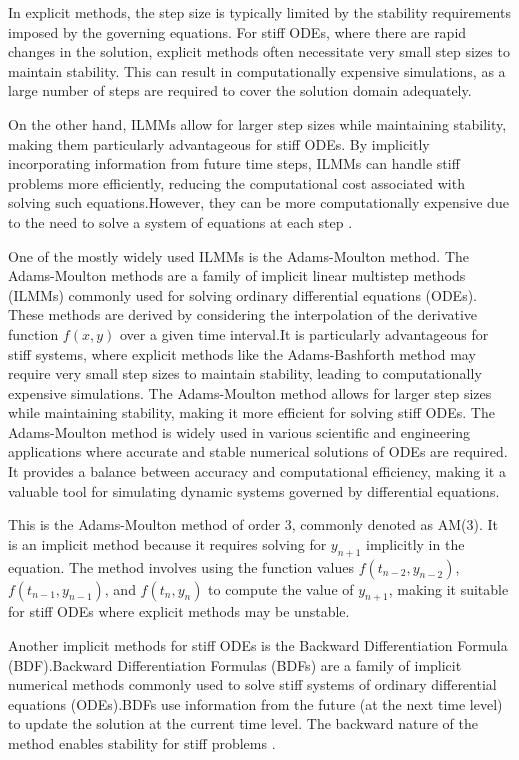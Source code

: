 In explicit methods, the step size is typically limited by the stability requirements imposed by the governing equations. For stiff ODEs, where there are rapid changes in the solution, explicit methods often necessitate very small step sizes to maintain stability. This can result in computationally expensive simulations, as a large number of steps are required to cover the solution domain adequately.

On the other hand, ILMMs allow for larger step sizes while maintaining stability, making them particularly advantageous for stiff ODEs. By implicitly incorporating information from future time steps, ILMMs can handle stiff problems more efficiently, reducing the computational cost associated with solving such equations.However, they can be more computationally expensive due to the need to solve a system of equations at each step \cite{thohura2013numerical}.

One of the mostly widely used ILMMs is the Adams-Moulton method. The Adams-Moulton methods are a family of implicit linear multistep methods (ILMMs) commonly used for solving ordinary differential equations (ODEs). These methods are derived by considering the interpolation of the derivative function $f(x,y)$ over a given time interval.It is particularly advantageous for stiff systems, where explicit methods like the Adams-Bashforth method may require very small step sizes to maintain stability, leading to computationally expensive simulations. The Adams-Moulton method allows for larger step sizes while maintaining stability, making it more efficient for solving stiff ODEs.
The Adams-Moulton method is widely used in various scientific and engineering applications where accurate and stable numerical solutions of ODEs are required. It provides a balance between accuracy and computational efficiency, making it a valuable tool for simulating dynamic systems governed by differential equations.




This is the Adams-Moulton method of order 3, commonly denoted as AM(3). It is an implicit method because it requires solving for \( y_{n+1} \) implicitly in the equation. The method involves using the function values \( f(t_{n-2}, y_{n-2}) \), \( f(t_{n-1}, y_{n-1}) \), and \( f(t_n, y_n) \) to compute the value of \( y_{n+1} \), making it suitable for stiff ODEs where explicit methods may be unstable.


Another implicit methods for stiff ODEs is the Backward Differentiation Formula (BDF).Backward Differentiation Formulas (BDFs) are a family of implicit numerical methods commonly used to solve stiff systems of ordinary differential equations (ODEs).BDFs use information from the future (at the next time level) to update the solution at the current time level. The backward nature of the method enables stability for stiff problems \cite{numericalrecipes}.

